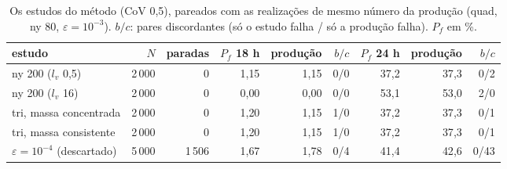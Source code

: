 \begin{table}[htbp]\centering\footnotesize\setlength{\tabcolsep}{3.5pt}
\caption{Os estudos do método (CoV 0,5), pareados com as realizações de mesmo número da produção (quad, ny 80, $\varepsilon = 10^{-3}$). $b/c$: pares discordantes (só o estudo falha / só a produção falha). $P_f$ em \%.}\label{tab:estudos}
\begin{tabular}{lrrrrrrrr}\toprule
estudo & $N$ & paradas & $P_f$ 18 h & produção & $b/c$ & $P_f$ 24 h & produção & $b/c$ \\\midrule
ny 200 ($l_v$ 0,5) & 2\,000 & 0 & 1{,}15 & 1{,}15 & 0/0 & 37{,}2 & 37{,}3 & 0/2 \\
ny 200 ($l_v$ 16) & 2\,000 & 0 & 0{,}00 & 0{,}00 & 0/0 & 53{,}1 & 53{,}0 & 2/0 \\
tri, massa concentrada & 2\,000 & 0 & 1{,}20 & 1{,}15 & 1/0 & 37{,}2 & 37{,}3 & 0/1 \\
tri, massa consistente & 2\,000 & 0 & 1{,}20 & 1{,}15 & 1/0 & 37{,}2 & 37{,}3 & 0/1 \\
$\varepsilon = 10^{-4}$ (descartado) & 5\,000 & 1\,506 & 1{,}67 & 1{,}78 & 0/4 & 41{,}4 & 42{,}6 & 0/43 \\
\bottomrule\end{tabular}\end{table}
